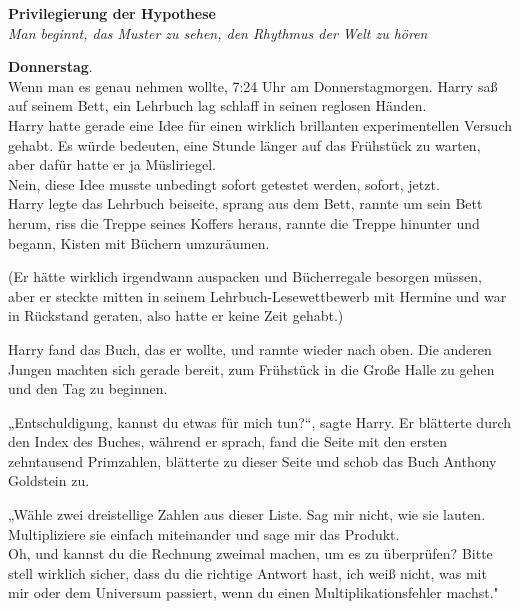 

\hypertarget{privilegierung-der-hypothese}{%

\textbf{Privilegierung der Hypothese}\\

\hfill\break \emph{Man beginnt, das Muster zu sehen, den Rhythmus der Welt zu hören}

\textbf{Donnerstag}.\\ Wenn man es genau nehmen wollte, 7:24 Uhr am Donnerstagmorgen. Harry saß auf seinem Bett, ein Lehrbuch lag schlaff in seinen reglosen Händen.\\ Harry hatte gerade eine Idee für einen wirklich brillanten experimentellen Versuch gehabt. Es würde bedeuten, eine Stunde länger auf das Frühstück zu warten, aber dafür hatte er ja Müsliriegel.\\ Nein, diese Idee musste unbedingt sofort getestet werden, sofort, jetzt.\\ Harry legte das Lehrbuch beiseite, sprang aus dem Bett, rannte um sein Bett herum, riss die Treppe seines Koffers heraus, rannte die Treppe hinunter und begann, Kisten mit Büchern umzuräumen.

(Er hätte wirklich irgendwann auspacken und Bücherregale besorgen müssen, aber er steckte mitten in seinem Lehrbuch-Lesewettbewerb mit Hermine und war in Rückstand geraten, also hatte er keine Zeit gehabt.)

Harry fand das Buch, das er wollte, und rannte wieder nach oben. Die anderen Jungen machten sich gerade bereit, zum Frühstück in die Große Halle zu gehen und den Tag zu beginnen.

„Entschuldigung, kannst du etwas für mich tun?“, sagte Harry. Er blätterte durch den Index des Buches, während er sprach, fand die Seite mit den ersten zehntausend Primzahlen, blätterte zu dieser Seite und schob das Buch Anthony Goldstein zu.

„Wähle zwei dreistellige Zahlen aus dieser Liste. Sag mir nicht, wie sie lauten. Multipliziere sie einfach miteinander und sage mir das Produkt.\\ Oh, und kannst du die Rechnung zweimal machen, um es zu überprüfen? Bitte stell wirklich sicher, dass du die richtige Antwort hast, ich weiß nicht, was mit mir oder dem Universum passiert, wenn du einen Multiplikationsfehler machst."

}
